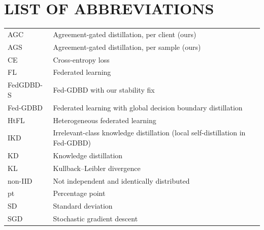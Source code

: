 \documentclass[12pt,a4paper,twoside,openany]{report}
\numberwithin{equation}{chapter}
\begin{document}
\chapter*{LIST OF ABBREVIATIONS}
\begin{tabular}{@{}p{3.2cm}p{10.5cm}@{}}
AGC & Agreement-gated distillation, per client (ours)\\
AGS & Agreement-gated distillation, per sample (ours)\\
CE & Cross-entropy loss\\
FL & Federated learning\\
FedGDBD-S & Fed-GDBD with our stability fix\\
Fed-GDBD & Federated learning with global decision boundary distillation \cite{zhang2025gdbd}\\
HtFL & Heterogeneous federated learning\\
IKD & Irrelevant-class knowledge distillation (local self-distillation in Fed-GDBD)\\
KD & Knowledge distillation\\
KL & Kullback--Leibler divergence\\
non-IID & Not independent and identically distributed\\
pt & Percentage point\\
SD & Standard deviation\\
SGD & Stochastic gradient descent\\
\end{tabular}

\clearpage
{}
\setcounter{page}{1}







\clearpage
{}


\appendix

\end{document}
